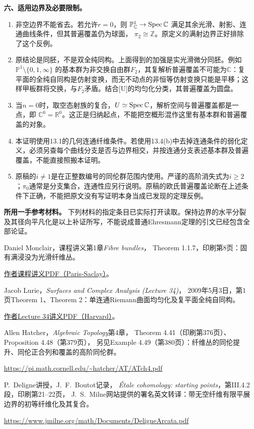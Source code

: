 \par\medskip\noindent\textbf{六、适用边界及必要限制。}
\begin{enumerate}[label=\arabic*.]
\item 非空边界不能省去。若允许$r=0$，则
$\mathbb P^1_{\mathbb C}\to\operatorname{Spec}\mathbb C$
满足其余光滑、射影、连通曲线条件，但其普遍覆盖仍为球面，
$\pi_2\cong\mathbb Z$。原定义的满射边界正好排除了这个反例。
\item 原结论是同胚，不是双全纯同构。上面得到的加强是实光滑微分同胚。例如
$\mathbb P^1\setminus\{0,1,\infty\}$
的基本群为非交换自由群$F_2$，其复解析普遍覆盖不可能为$\mathbb C$：复平面的全纯自同构是仿射变换，而无不动点的非恒等仿射变换只能是平移；这样甲板群将交换，与$F_2$矛盾。结合[U]的均匀化分类，其普遍覆盖为圆盘。
\item 当$n=0$时，取空态射族的复合，$U\simeq\operatorname{Spec}\mathbb C$，解析空间与普遍覆盖都是一点，即
$\mathbb C^0=\mathbb R^0$。这正是归纳起点，不能把空概形混作这里有基本群和普遍覆盖的对象。
\item 本证明使用13.1的几何连通纤维条件。若使用13.4(b)中去掉连通条件的弱化定义，必须另查每个曲线分支是否与边界相交，并按连通分支表述基本群及普遍覆盖，不能直接照搬本证明。
\item 原稿的$i\ne1$是在正整数编号的同伦群范围内使用。严谨的高阶消失式为$i\geq2$；$\pi_0$通常是分支集合，连通性应另行说明。原稿的欧氏普遍覆盖论断在上述条件下正确，不能把原文没有写证明本身当成已发现的定理反例。
\end{enumerate}

\par\medskip\noindent\textbf{所用一手参考材料。}
下列材料的指定条目已实际打开读取。保持边界的水平分裂及其径向平凡化是以上补证所写，不能说成普通Ehresmann定理的引文已经包含全部论证。
\begin{description}[style=nextline]
\item[{[E]}] Daniel Monclair，课程讲义第1章\emph{Fibre bundles}，
Theorem 1.1.7，印刷第8页：固有满浸没为光滑纤维丛。
\par\href{https://www.imo.universite-paris-saclay.fr/~daniel.monclair/chap2.pdf}{作者课程讲义PDF（Paris-Saclay）}。
\item[{[U]}] Jacob Lurie，\emph{Surfaces and Complex Analysis (Lecture 34)}，
2009年5月3日，第1页Theorem 1、Theorem 2：单连通Riemann曲面均匀化及复平面全纯自同构。
\par\href{https://people.math.harvard.edu/~lurie/937notes/937Lecture34.pdf}{作者Lecture 34讲义PDF（Harvard）}。
\item[{[H]}] Allen Hatcher，\emph{Algebraic Topology}第4章，
Theorem 4.41（印刷第376页）、Proposition 4.48（第379页），
另见Example 4.49（第380页）：纤维丛的同伦提升、同伦正合列和覆盖的高阶同伦群。
\par\url{https://pi.math.cornell.edu/~hatcher/AT/ATch4.pdf}
\item[{[D]}] P.~Deligne讲授，J.~F.~Boutot记录，
\emph{Étale cohomology: starting points}，第III.4.2段，印刷第21--22页，
J.~S.~Milne网站提供的署名英文转译：带无空纤维有限平展边界的初等纤维化及其复合。
\par\url{https://www.jmilne.org/math/Documents/DeligneArcata.pdf}
\end{description}
